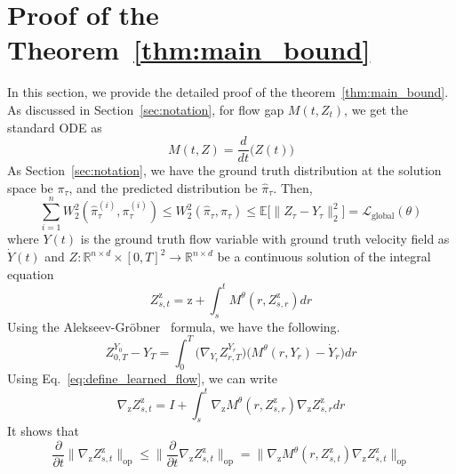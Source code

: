 \documentclass{article}
\begin{document}
\section{Proof of the Theorem~\ref{thm:main_bound}}
\label{appendix:Proof_mean_bound}
In this section, we provide the detailed proof of the theorem~\ref{thm:main_bound}. As discussed in Section~\ref{sec:notation}, for flow gap $M(t, Z_t)$, we get the standard ODE as 
\begin{equation}
    M(t, Z ) = \frac{d}{dt}\Big(Z(t) \Big)
\end{equation}
As Section~\ref{sec:notation}, we have the ground truth distribution at the solution space be $\pi_\tau$, and the predicted distribution be $\hat{\pi}_\tau$. Then, 
\begin{equation}
    \sum_{i=1}^{n} W^2_2(\hat{\pi}^{(i)}_\tau, \pi^{(i)}_\tau) \leq W^2_2(\hat{\pi}_\tau, \pi_\tau)  \leq \mathbb{E} \Big[\| Z_\tau - Y_\tau \|^2_2 \Big] = \mathcal{L}_{\text{global}}(\theta)
\end{equation}
where $Y(t)$ is the ground truth flow variable with ground truth velocity field as $\dot{Y}(t)$ and  $Z: \mathbb{R}^{n \times d} \times [0,T]^2 \to \mathbb{R}^{n \times d}$ be a continuous solution of the integral equation 
\begin{equation}
    Z^{\mathrm{z}}_{s,t} = \mathrm{z} + \int_{s}^{t} M^{\theta}(r, Z^{\mathrm{z}}_{s,r}) dr \label{eq:define_learned_flow}
\end{equation}
Using the Alekseev-Gröbner~\citep{grobner1960lie} formula, we have the following. 
\begin{equation}
    Z^{Y_0}_{0,T} - Y_T = \int_{0}^{T} \Big(\nabla_{Y_r} Z^{Y_r}_{r,T}\Big) \Big(M^{\theta}(r,Y_r) - \dot{Y}_r \Big) dr  \label{eq:Alek_Gro_formula}
\end{equation}
Using Eq.~\ref{eq:define_learned_flow}, we can write 
\begin{equation}
    \nabla_{\mathrm{z}} Z^{\mathrm{z}}_{s,t} = I + \int_{s}^{t} \nabla_{\mathrm{z}} M^{\theta}(r, Z^{\mathrm{z}}_{s,r}) \nabla_{\mathrm{z}} Z^{\mathrm{z}}_{s,r} dr
\end{equation}
It shows that 
\begin{equation}
    \frac{\partial}{\partial t} \|\nabla_{\mathrm{z}}  Z^{\mathrm{z}}_{s,t}\|_{\text{op}} \leq \| \frac{\partial}{\partial t} \nabla_{\mathrm{z}}  Z^{\mathrm{z}}_{s,t}\|_{\text{op}} = \| \nabla_{\mathrm{z}} M^{\theta}(r, Z^{\mathrm{z}}_{s,t})  \nabla_{\mathrm{z}} Z^{\mathrm{z}}_{s,t}\|_{\text{op}}
\end{equation}
\end{document}
